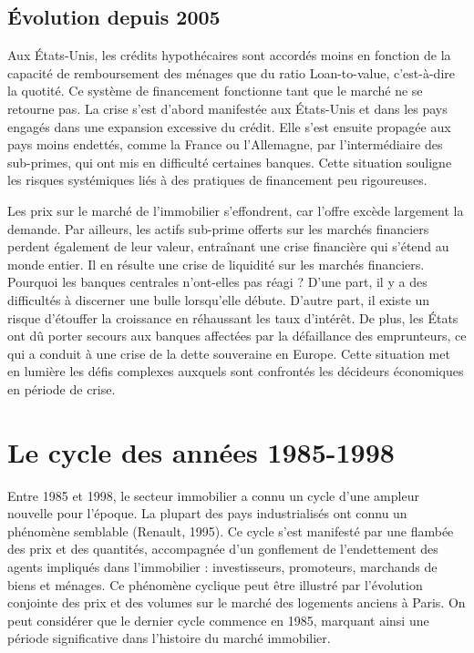 \documentclass[a4paper, 12pt]{report}
\begin{document}
\subsection{Évolution depuis 2005}

Aux États-Unis, les crédits hypothécaires sont accordés moins en fonction de la capacité de remboursement des ménages que du ratio Loan-to-value, c'est-à-dire la quotité. Ce système de financement fonctionne tant que le marché ne se retourne pas. La crise s'est d'abord manifestée aux États-Unis et dans les pays engagés dans une expansion excessive du crédit. Elle s'est ensuite propagée aux pays moins endettés, comme la France ou l'Allemagne, par l'intermédiaire des sub-primes, qui ont mis en difficulté certaines banques. Cette situation souligne les risques systémiques liés à des pratiques de financement peu rigoureuses.

Les prix sur le marché de l'immobilier s'effondrent, car l'offre excède largement la demande. Par ailleurs, les actifs sub-prime offerts sur les marchés financiers perdent également de leur valeur, entraînant une crise financière qui s'étend au monde entier. Il en résulte une crise de liquidité sur les marchés financiers. Pourquoi les banques centrales n'ont-elles pas réagi ? D'une part, il y a des difficultés à discerner une bulle lorsqu'elle débute. D'autre part, il existe un risque d'étouffer la croissance en réhaussant les taux d'intérêt. De plus, les États ont dû porter secours aux banques affectées par la défaillance des emprunteurs, ce qui a conduit à une crise de la dette souveraine en Europe. Cette situation met en lumière les défis complexes auxquels sont confrontés les décideurs économiques en période de crise.

\section{Le cycle des années 1985-1998}

Entre 1985 et 1998, le secteur immobilier a connu un cycle d'une ampleur nouvelle pour l'époque. La plupart des pays industrialisés ont connu un phénomène semblable (Renault, 1995). Ce cycle s'est manifesté par une flambée des prix et des quantités, accompagnée d'un gonflement de l'endettement des agents impliqués dans l'immobilier : investisseurs, promoteurs, marchands de biens et ménages. Ce phénomène cyclique peut être illustré par l'évolution conjointe des prix et des volumes sur le marché des logements anciens à Paris. On peut considérer que le dernier cycle commence en 1985, marquant ainsi une période significative dans l'histoire du marché immobilier.
\end{document}
